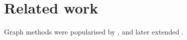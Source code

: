\documentclass{article}
\begin{document}
\section{Related work}
Graph methods were popularised by \textcite{page1999}, and later extended
\parencite{kleinberg1999,brin1998}.

\printbibliography
\end{document}
